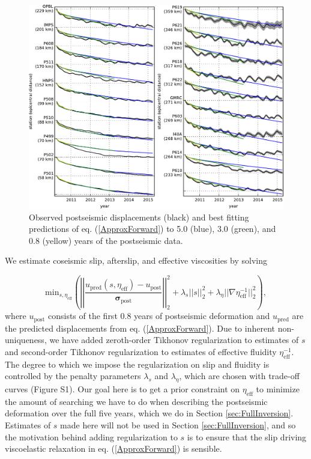 \documentclass[draft,linenumbers]{AGUJournal}
\begin{document}
\begin{figure}
\includegraphics[scale=0.9]{Figures/RecordSectionDuration}
\centering 
\caption{Observed postseismic displacements (black) and best fitting predictions of eq. (\ref{ApproxForward}) to 5.0 (blue), 3.0 (green), and 0.8 (yellow) years of the postseismic data.} 
\label{fig:RecordSection1}
\end{figure}

We estimate coseismic slip, afterslip, and effective viscosities by solving 

\begin{equation}\label{ObjectiveFunction}
 \mathrm{min}_{s,\eta_\mathrm{eff}} \left(\left|\left|
 \frac{u_\mathrm{pred}(s,\eta_\mathrm{eff}) - u_\mathrm{post}}
 {\mathbf{\sigma_\mathrm{post}}}\right|\right|_2^2 + 
 \lambda_s||s||_2^2 + 
 \lambda_\eta||\nabla \eta_{\mathrm{eff}}^{-1}||_2^2\right),
\end{equation} 
where $u_\mathrm{post}$ consists of the first 0.8 years of postseismic deformation and $u_\mathrm{pred}$ are the predicted displacements from eq. (\ref{ApproxForward}).  Due to inherent non-uniqueness, we have added zeroth-order Tikhonov regularization to estimates of $s$ and second-order Tikhonov regularization to estimates of effective fluidity $\eta_\mathrm{eff}^{-1}$. The degree to which we impose the regularization on slip and fluidity is controlled by the penalty parameters $\lambda_s$ and $\lambda_\eta$, which are chosen with trade-off curves (Figure S1).  Our goal here is to get a prior constraint on $\eta_{\mathrm{eff}}$ to minimize the amount of searching we have to do when describing the postseismic deformation over the full five years, which we do in Section \ref{sec:FullInversion}.  Estimates of $s$ made here will not be used in Section \ref{sec:FullInversion}, and so the motivation behind adding regularization to $s$ is to ensure that the slip driving viscoelastic relaxation in eq. (\ref{ApproxForward}) is sensible.  
\end{document}
